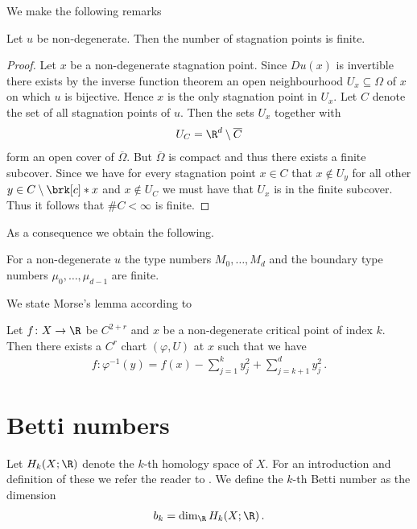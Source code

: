 We make the following remarks
\begin{proposition}
  Let $u$ be non-degenerate. Then the number of
  stagnation points is finite.
\end{proposition}
\begin{proof}
  Let $x$ be a non-degenerate stagnation point. Since $Du(x)$ is invertible there exists
  by the inverse function theorem an open neighbourhood $U_x\subseteq\Omega$ of $x$ on which 
  $u$ is bijective. Hence $x$ is the only stagnation point in $U_x$. Let $C$ denote the set of all
  stagnation points of $u$. Then the sets $U_x$ together with
  \begin{align}
    U_C=\R^d\setminus \overline{C}
  \end{align}
  form an open cover of $\overline{\Omega}$. But $\overline{\Omega}$ is compact and thus there exists
  a finite subcover. Since we have for every stagnation point $x\in C$ that
  $x\not\in U_y$ for all other $y\in C\setminus\brk[c]*{x}$ and $x\not\in U_C$ we must have that $U_x$
  is in the finite subcover. Thus it follows that $\#C<\infty$ is finite.
\end{proof}
As a consequence we obtain the following.
\begin{corollary}
  For a non-degenerate $u$ the type numbers $M_0,\dots,M_d$ and the boundary type numbers $\mu_0,\dots,\mu_{d-1}$
  are finite.
\end{corollary}


We state Morse's lemma according to \cite[p.145]{Hirsch1994}
\begin{lemma}
  Let $f\colon X\to\R$ be $C^{2+r}$ and $x$ be a non-degenerate
  critical point of index $k$. Then there exists a $C^r$ chart $(\varphi,U)$ at $x$
  such that we have
  \begin{align*}
    f\colon\varphi^{-1}(y)=f(x)-\sum_{j=1}^ky_j^2+\sum_{j=k+1}^dy_j^2\,.
  \end{align*}
\end{lemma}


\section{Betti numbers}

Let $H_k(X;\R)$ denote the $k$-th homology space of $X$.
For an introduction and definition of these we refer the reader to \cite[Chapter 2]{Hatcher2002}.
We define the $k$-th Betti number as the dimension
\begin{align}
  b_k=\dim_\R H_k(X;\R)\,.\label{eq:df_bettiNbrs}
\end{align}

